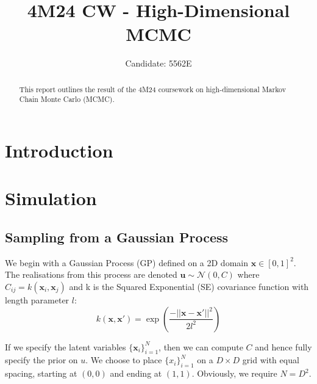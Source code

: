 \documentclass[]{article}
\title{4M24 CW - High-Dimensional MCMC}
\author{Candidate: 5562E}
\newcommand{\Ncal}{\mathcal{N}}
\newcommand{\xbold}{\boldsymbol{x}}
\newcommand{\ubold}{\boldsymbol{u}}
\begin{document}


\setcounter{page}{1}
\maketitle

\begin{abstract}
	This report outlines the result of the 4M24 coursework on high-dimensional Markov Chain Monte Carlo (MCMC).
\end{abstract}

\tableofcontents

\section{Introduction}

\pagebreak
\section{Simulation}
\subsection{Sampling from a Gaussian Process}

We begin with a Gaussian Process (GP) defined on a 2D domain $\xbold \in [0, 1]^2$. The realisations from this process are denoted $\ubold \sim \Ncal(0, C)$ where $C_{ij} = k(\xbold_i, \xbold_j)$ and k is the Squared Exponential (SE) covariance function with length parameter $l$:
%
\begin{equation}
	k(\xbold, \xbold ') = \exp \left( \frac{-||\xbold - \xbold '||^2}{2l^2}\right)
	\label{eqn:k-defn}
\end{equation}

If we specify the latent variables $\{\xbold_i\}_{i=1}^N$, then we can compute $C$ and hence fully specify the prior on $u$. We choose to place $\{x_i\}_{i=1}^N$ on a $D \times D$ grid with equal spacing, starting at $(0,0)$ and ending at $(1,1)$. Obviously, we require $N = D^2$.
\end{document}
